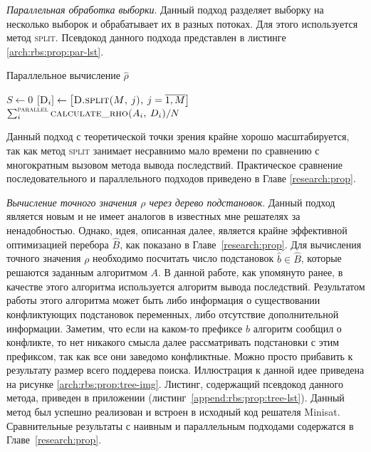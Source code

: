\textit{Параллельная обработка выборки}\label{arch:rbs:prop:par}. Данный подход разделяет выборку
на несколько выборок и обрабатывает их в разных потоках. Для этого используется метод \textsc{split}.
Псевдокод данного подхода представлен в листинге \ref{arch:rbs:prop:par-lst}.

\begin{algorithm}[H]
\caption{Параллельное вычисление $\hat{\rho}$}\label{arch:rbs:prop:par-lst}
\begin{algorithmic}
        \State $S \leftarrow 0$
        \State $[\textsc{D}_i] \leftarrow \left[\textsc{D.split($M$, $j$),~ $j=\overline{1,M}$}\right]$
        \State\Return $\sum_{i}^{\textsc{parallel}}{\textsc{calculate\_rho($A_i$, $D_i$)}} / N$
	\EndFunction
\end{algorithmic}
\end{algorithm}

Данный подход с теоретической точки зрения крайне хорошо масштабируется, так как метод \textsc{split}
занимает несравнимо мало времени по сравнению с многократным вызовом метода вывода последствий. Практическое
сравнение последовательного и параллельного подходов приведено в Главе \ref{research:prop}.

\textit{Вычисление точного значения $\rho$ через дерево подстановок}\label{arch:rbs:prop:tree}.
Данный подход является новым и не имеет аналогов в известных мне решателях за ненадобностью. Однако,
идея, описанная далее, является крайне эффективной оптимизацией перебора $\hat{B}$, как показано в
Главе~\ref{research:prop}. Для вычисления точного значения $\rho$ необходимо посчитать число
подстановок $\hat{b} \in \hat{B}$, которые решаются заданным алгоритмом $A$. В данной работе, как
упомянуто ранее, в качестве этого алгоритма используется алгоритм вывода последствий. Результатом
работы этого алгоритма может быть либо информация о существовании конфликтующих подстановок переменных,
либо отсутствие дополнительной информации. Заметим, что если на каком-то префиксе $\hat{b}$ 
алгоритм сообщил о конфликте, то нет никакого смысла далее рассматривать подстановки с этим префиксом,
так как все они заведомо конфликтные. Можно просто прибавить к результату размер всего поддерева поиска.
Иллюстрация к данной идее приведена на рисунке \ref{arch:rbs:prop:tree-img}. Листинг, содержащий
псевдокод данного метода, приведен в приложении (листинг~\ref{append:rbs:prop:tree-lst}). Данный
метод был успешно реализован и встроен в исходный код решателя Minisat. Сравнительные результаты
с наивным и параллельным подходами содержатся в Главе~\ref{research:prop}.

